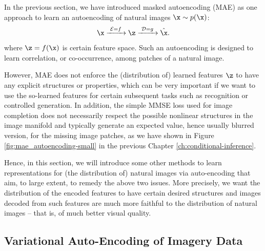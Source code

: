 \documentclass[../../book-main.tex]{subfiles}
\begin{document}
In the previous section, we have introduced masked autoencoding (MAE)
as one approach to learn an autoencoding of natural images $\x \sim p(\x)$:
\begin{equation}
\x\xrightarrow{\hspace{1mm} \mathcal{E} = f \hspace{1mm}} \z
\xrightarrow{\hspace{1mm} \mathcal{D} = g \hspace{1mm}} \hat{\x}.
\end{equation}
where $\z = f(\x)$ is certain feature space. Such an autoencoding is
designed to learn correlation, or co-occurrence, among  patches of a
natural image.

However, MAE does not  enforce the (distribution of) learned features
$\z$ to have any explicit structures or properties, which can be very
important if we want to use the so-learned features for certain
subsequent tasks such as recognition or controlled generation. In
addition, the simple MMSE loss used for image completion does not
necessarily respect the possible nonlinear structures in the image
manifold and typically generate an expected value, hence usually
blurred version, for the missing image patches, as we have shown in
Figure \ref{fig:mae_autoencoding-small} in the previous Chapter
\ref{ch:conditional-inference}.

Hence, in this section, we will introduce some other methods to learn
representations for (the distribution of) natural images via
auto-encoding that aim, to large extent, to remedy the above two
issues. More precisely, we want the distribution of the encoded
features to have certain desired structures and images decoded from
such features are much more faithful to the distribution of natural
images -- that is, of much better visual quality.

\subsection{Variational Auto-Encoding of Imagery Data}
\end{document}
